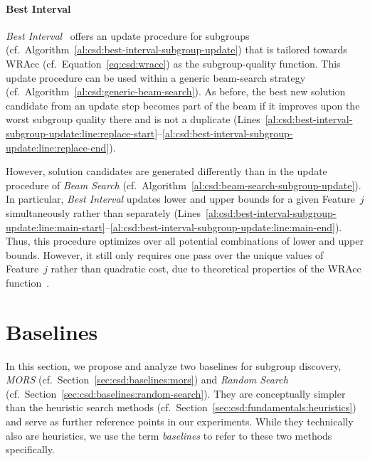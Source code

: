 \documentclass{article}
\theoremstyle{definition}
\begin{document}
\paragraph{Best Interval}

\emph{Best Interval}~\cite{mampaey2012efficient} offers an update procedure for subgroups (cf.~Algorithm~\ref{al:csd:best-interval-subgroup-update}) that is tailored towards WRAcc (cf.~Equation~\ref{eq:csd:wracc}) as the subgroup-quality function.
This update procedure can be used within a generic beam-search strategy (cf.~Algorithm~\ref{al:csd:generic-beam-search}).
As before, the best new solution candidate from an update step becomes part of the beam if it improves upon the worst subgroup quality there and is not a duplicate (Lines~\ref{al:csd:best-interval-subgroup-update:line:replace-start}--\ref{al:csd:best-interval-subgroup-update:line:replace-end}).

However, solution candidates are generated differently than in the update procedure of \emph{Beam Search} (cf.~Algorithm~\ref{al:csd:beam-search-subgroup-update}).
In particular, \emph{Best Interval} updates lower and upper bounds for a given Feature~$j$ simultaneously rather than separately (Lines~\ref{al:csd:best-interval-subgroup-update:line:main-start}--\ref{al:csd:best-interval-subgroup-update:line:main-end}).
Thus, this procedure optimizes over all potential combinations of lower and upper bounds.
However, it still only requires one pass over the unique values of Feature~$j$ rather than quadratic cost, due to theoretical properties of the WRAcc function~\cite{mampaey2012efficient}.

\section{Baselines}
\label{sec:csd:baselines}

In this section, we propose and analyze two baselines for subgroup discovery, \emph{MORS} (cf.~Section~\ref{sec:csd:baselines:mors}) and \emph{Random Search} (cf.~Section~\ref{sec:csd:baselines:random-search}).
They are conceptually simpler than the heuristic search methods (cf.~Section~\ref{sec:csd:fundamentals:heuristics}) and serve as further reference points in our experiments.
While they technically also are heuristics, we use the term \emph{baselines} to refer to these two methods specifically.
\end{document}
